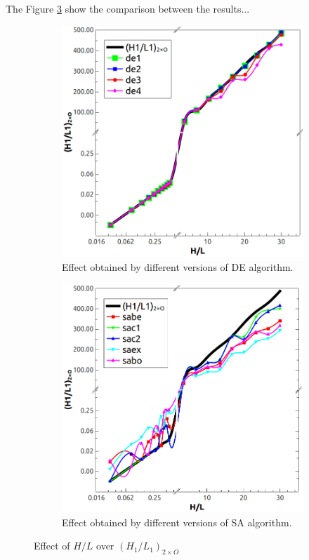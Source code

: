 \documentclass[10pt,fleqn,a4paper,twoside]{article}
\begin{document}
The Figure \ref{figure06} show the comparison between the results...

\begin{figure}[h!]
\centering
	\begin{subfigure}{0.52\textwidth}
		\centering
		\includegraphics[width=1\linewidth]{imgs/de/g_hl_h1l1_1.png}
		\caption{ {\small Effect obtained by different versions of DE algorithm.}}
		\label{figure06:sub1}
	\end{subfigure}%
	\begin{subfigure}{0.52\textwidth}
		\centering
		\includegraphics[width=1\linewidth]{imgs/sa/g_hl_h1l1_1.png}
		\caption{ {\small Effect obtained by different versions of SA algorithm.}}
		\label{figure06:sub2}
	\end{subfigure}%
\caption{Effect of $H/L$ over ${(H_{1}/L_{1})_{2\times O}}$}
\label{figure06}
\end{figure}
\end{document}
